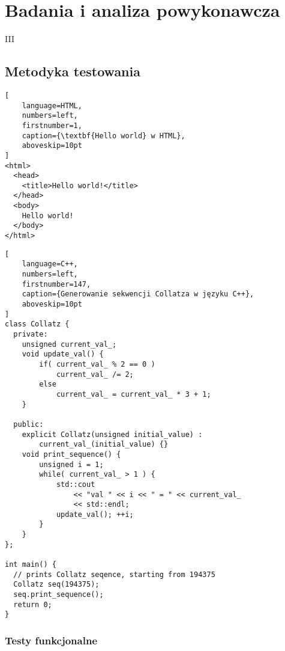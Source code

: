 \part{Badania i analiza powykonawcza}{III}
\noindent \lipsum[1-5]

\clearpage\chapter{Metodyka testowania}
\noindent \lipsum[6-8]

\begin{addmargin}[8mm]{0mm}
\begin{lstlisting}[
    language=HTML,
    numbers=left,
    firstnumber=1,
    caption={\textbf{Hello world} w HTML},
    aboveskip=10pt
]
<html>
  <head>
    <title>Hello world!</title>
  </head>
  <body>
    Hello world!
  </body>
</html>
\end{lstlisting}
\end{addmargin}

\lipsum[9-10]
\begin{addmargin}[12mm]{0mm}
\begin{lstlisting}[
    language=C++,
    numbers=left,
    firstnumber=147,
    caption={Generowanie sekwencji Collatza w języku C++},
    aboveskip=10pt
]
class Collatz {
  private:
    unsigned current_val_;
    void update_val() {
        if( current_val_ % 2 == 0 )
            current_val_ /= 2;
        else
            current_val_ = current_val_ * 3 + 1;
    }

  public:
    explicit Collatz(unsigned initial_value) :
        current_val_(initial_value) {}
    void print_sequence() {
        unsigned i = 1;
        while( current_val_ > 1 ) {
            std::cout
                << "val " << i << " = " << current_val_
                << std::endl;
            update_val(); ++i;
        }
    }
};

int main() {
  // prints Collatz seqence, starting from 194375
  Collatz seq(194375);
  seq.print_sequence();
  return 0;
}
\end{lstlisting}
\end{addmargin}

\lipsum[10-12]
 
    \section{Testy funkcjonalne}
      \noindent\lipsum[1-3]

